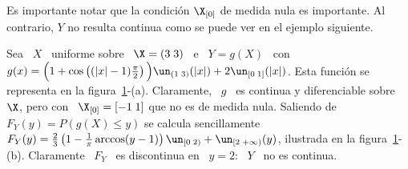 Es  importante   notar  que  la   condici\'on  $\X_{[0]}$  de  medida   nula  es
importante. Al  contrario, $Y$  no resulta  continua como se  puede ver  en el
ejemplo siguiente.
%
\begin{ejemplo}
\label{Ej:MP:X0MedidaNoNula}
%
Sea \ $X$ \ uniforme sobre  \ $\X = ( 3 \; 3)$ \ e \ $Y  = g(X)$ \ con \ $g(x) =
\Big(  1 +  \cos\left(  (|x|-1) \frac{\pi}{2} \right) \Big)  \un_{(1 \;  3)}(|x|) +  2
  \un_{[0    \;   1]}(|x|)$.     Esta    funci\'on   se    representa   en    la
  figura~\ref{Fig:MP:TransformacionVANoContinua}-(a).   Claramente, \  $g$  \ es
  continua y diferenciable sobre $\X$, pero con \ $\X_{[0]} = [ -1 \; 1]$ que no
  es  de  medida  nula.   Saliendo  de  $F_Y(y) =  P(g(X)  \le  y)$  se  calcula
  sencillamente  $F_Y(y) =  \frac23 \left(  1 -  \frac1\pi  \arccos(y-1) \right)
  \un_{[0   \;   2)}   +   \un_{[   2  \;   +\infty)}(y)$,   ilustrada   en   la
  figura~\ref{Fig:MP:TransformacionVANoContinua}-(b).   Claramente \ $F_Y$  \ es
  discontinua en \ $y = 2$: \ $Y$ \ no es continua.
  \begin{figure}[h!]
  \begin{center}  \end{center}
  \label{Fig:MP:TransformacionVANoContinua}
  \end{figure}
\end{ejemplo}

